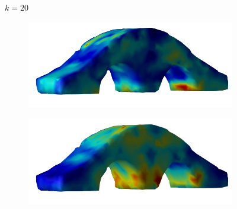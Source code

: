 \documentclass[11pt,titlepage]{article}
\begin{document}
\begin{figure}[!htbp]
\begin{center}
        $k=20$
        \quad
        \begin{subfigure}[b]{0.4\textwidth}
            \centering
            \includegraphics[width=\textwidth]{jacopt_vm/resized/archbridge_tiny_21}
        \end{subfigure}
        \begin{subfigure}[b]{0.4\textwidth}
            \centering
            \includegraphics[width=\textwidth]{soropt_vm/resized/archbridge_tiny_21}
        \end{subfigure}\\ 



\end{center}
\end{figure}
\end{document}
